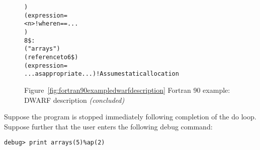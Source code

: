 \begin{figure}
\begin{dwflisting}
\begin{alltt}
                )
            (expression=
                <n>            ! where n == ...
                )
8\$: 
        ("arrays")
        (reference to 6\$)
        (expression=
            ...as appropriate...)       ! Assume static allocation
\end{alltt}
\end{dwflisting}
\begin{center}

Figure~\ref{fig:fortran90exampledwarfdescription} Fortran 90 example: DWARF description \textit{(concluded)}
\end{center}
\end{figure}

Suppose 
the program is stopped immediately following completion
of the do loop. Suppose further that the user enters the
following debug command:

\begin{lstlisting}[numbers=none]
debug> print arrays(5)%ap(2)
\end{lstlisting}

